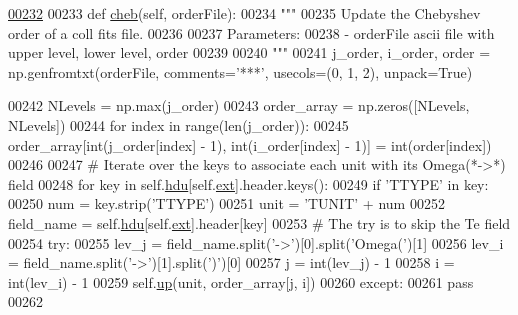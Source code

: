 \begin{DoxyCode}
\hypertarget{classpyneb_1_1utils_1_1fits_1_1_hdr_l00232}{}\hyperlink{classpyneb_1_1utils_1_1fits_1_1_hdr_ae3914322f5f8fa906d003987bb4dfb9a}{00232} 
00233     \textcolor{keyword}{def }\hyperlink{classpyneb_1_1utils_1_1fits_1_1_hdr_ae3914322f5f8fa906d003987bb4dfb9a}{cheb}(self, orderFile):    
00234         \textcolor{stringliteral}{""" }
00235 \textcolor{stringliteral}{        Update the Chebyshev order of a coll fits file.}
00236 \textcolor{stringliteral}{        }
00237 \textcolor{stringliteral}{        Parameters:}
00238 \textcolor{stringliteral}{            - orderFile    ascii file with upper level, lower level, order}
00239 \textcolor{stringliteral}{        }
00240 \textcolor{stringliteral}{        """}    
00241         j\_order, i\_order, order = np.genfromtxt(orderFile, comments=\textcolor{stringliteral}{'***'}, usecols=(0, 1, 2), unpack=\textcolor{keyword}{True}) 
         
00242         NLevels = np.max(j\_order)
00243         order\_array = np.zeros([NLevels, NLevels])
00244         \textcolor{keywordflow}{for} index \textcolor{keywordflow}{in} range(len(j\_order)):
00245             order\_array[int(j\_order[index] - 1), int(i\_order[index] - 1)] = int(order[index])
00246             
00247         \textcolor{comment}{# Iterate over the keys to associate each unit with its Omega(*->*) field}
00248         \textcolor{keywordflow}{for} key \textcolor{keywordflow}{in} self.\hyperlink{classpyneb_1_1utils_1_1fits_1_1_hdr_a23de98701ac30e7c56654f92d9956fca}{hdu}[self.\hyperlink{classpyneb_1_1utils_1_1fits_1_1_hdr_a1c2f102effab05a497e3a21ed3291359}{ext}].header.keys():
00249             \textcolor{keywordflow}{if} \textcolor{stringliteral}{'TTYPE'} \textcolor{keywordflow}{in} key:
00250                 num = key.strip(\textcolor{stringliteral}{'TTYPE'})
00251                 unit = \textcolor{stringliteral}{'TUNIT'} + num
00252                 field\_name = self.\hyperlink{classpyneb_1_1utils_1_1fits_1_1_hdr_a23de98701ac30e7c56654f92d9956fca}{hdu}[self.\hyperlink{classpyneb_1_1utils_1_1fits_1_1_hdr_a1c2f102effab05a497e3a21ed3291359}{ext}].header[key]
00253                 \textcolor{comment}{# The try is to skip the Te field}
00254                 \textcolor{keywordflow}{try}:
00255                     lev\_j = field\_name.split(\textcolor{stringliteral}{'->'})[0].split(\textcolor{stringliteral}{'Omega('})[1]
00256                     lev\_i = field\_name.split(\textcolor{stringliteral}{'->'})[1].split(\textcolor{stringliteral}{')'})[0]
00257                     j = int(lev\_j) - 1
00258                     i = int(lev\_i) - 1
00259                     self.\hyperlink{classpyneb_1_1utils_1_1fits_1_1_hdr_a52ee04bb03279ed65bbd5412154d08e2}{up}(unit, order\_array[j, i])
00260                 \textcolor{keywordflow}{except}:
00261                     \textcolor{keywordflow}{pass}
00262 

\end{DoxyCode}
